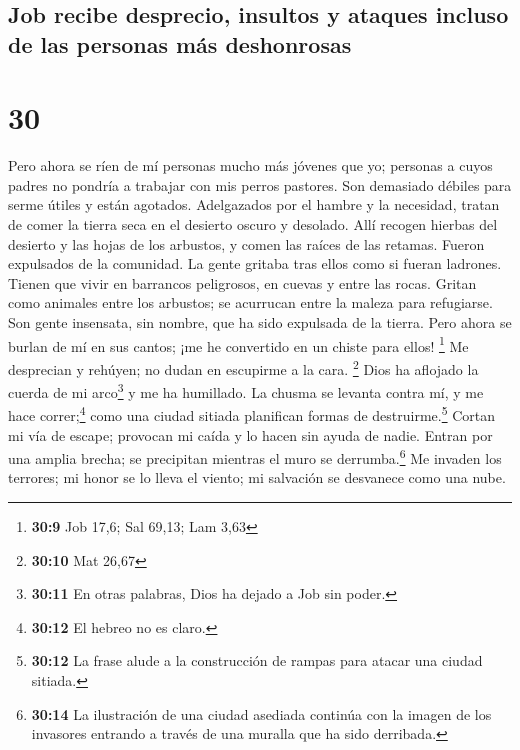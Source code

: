 \hypertarget{job-recibe-desprecio-insultos-y-ataques-incluso-de-las-personas-muxe1s-deshonrosas}{%
\subsection{Job recibe desprecio, insultos y ataques incluso de las
personas más
deshonrosas}\label{job-recibe-desprecio-insultos-y-ataques-incluso-de-las-personas-muxe1s-deshonrosas}}

\hypertarget{section-29}{%
\section{30}\label{section-29}}

 Pero ahora se ríen de mí personas mucho más jóvenes que
yo; personas a cuyos padres no pondría a trabajar con mis perros
pastores.  Son demasiado débiles para serme útiles y están
agotados.  Adelgazados por el hambre y la necesidad,
tratan de comer la tierra seca en el desierto oscuro y desolado.
 Allí recogen hierbas del desierto y las hojas de los
arbustos, y comen las raíces de las retamas.  Fueron
expulsados de la comunidad.  La gente gritaba tras ellos
como si fueran ladrones. Tienen que vivir en barrancos peligrosos, en
cuevas y entre las rocas.  Gritan como animales entre los
arbustos; se acurrucan entre la maleza para refugiarse. 
Son gente insensata, sin nombre, que ha sido expulsada de la tierra.
 Pero ahora se burlan de mí en sus cantos; ¡me he
convertido en un chiste para ellos! \footnote{\textbf{30:9} Job 17,6;
  Sal 69,13; Lam 3,63}  Me desprecian y rehúyen; no dudan
en escupirme a la cara. \footnote{\textbf{30:10} Mat 26,67}
 Dios ha aflojado la cuerda de mi arco\footnote{\textbf{30:11}
  En otras palabras, Dios ha dejado a Job sin poder.} y me ha humillado.
 La chusma se levanta contra mí, y me hace
correr;\footnote{\textbf{30:12} El hebreo no es claro.} como una ciudad
sitiada planifican formas de destruirme.\footnote{\textbf{30:12} La
  frase alude a la construcción de rampas para atacar una ciudad
  sitiada.}  Cortan mi vía de escape; provocan mi caída y
lo hacen sin ayuda de nadie.  Entran por una amplia
brecha; se precipitan mientras el muro se derrumba.\footnote{\textbf{30:14}
  La ilustración de una ciudad asediada continúa con la imagen de los
  invasores entrando a través de una muralla que ha sido derribada.}
 Me invaden los terrores; mi honor se lo lleva el viento;
mi salvación se desvanece como una nube.

